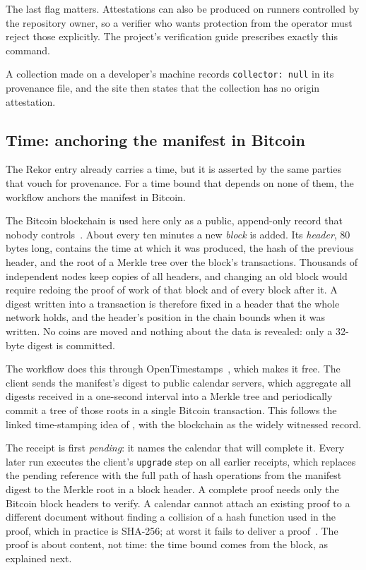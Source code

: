 The last flag matters. Attestations can also be produced on runners controlled by the repository owner, so a verifier who wants protection from the operator must reject those explicitly. The project's verification guide prescribes exactly this command.

A collection made on a developer's machine records \texttt{collector:\ null} in its provenance file, and the site then states that the collection has no origin attestation.

\subsection{Time: anchoring the manifest in Bitcoin}
\label{sec:time}

The Rekor entry already carries a time, but it is asserted by the same parties that vouch for provenance. For a time bound that depends on none of them, the workflow anchors the manifest in Bitcoin.

The Bitcoin blockchain is used here only as a public, append-only record that nobody controls~\citep{nakamoto2008bitcoin}. About every ten minutes a new \emph{block} is added. Its \emph{header}, 80 bytes long, contains the time at which it was produced, the hash of the previous header, and the root of a Merkle tree over the block's transactions. Thousands of independent nodes keep copies of all headers, and changing an old block would require redoing the proof of work of that block and of every block after it. A digest written into a transaction is therefore fixed in a header that the whole network holds, and the header's position in the chain bounds when it was written. No coins are moved and nothing about the data is revealed: only a 32-byte digest is committed.

The workflow does this through OpenTimestamps~\citep{todd2016opentimestamps}, which makes it free. The client sends the manifest's digest to public calendar servers, which aggregate all digests received in a one-second interval into a Merkle tree and periodically commit a tree of those roots in a single Bitcoin transaction. This follows the linked time-stamping idea of \citet{haber1991timestamp}, with the blockchain as the widely witnessed record.

The receipt is first \emph{pending}: it names the calendar that will complete it. Every later run executes the client's \texttt{upgrade} step on all earlier receipts, which replaces the pending reference with the full path of hash operations from the manifest digest to the Merkle root in a block header. A complete proof needs only the Bitcoin block headers to verify. A calendar cannot attach an existing proof to a different document without finding a collision of a hash function used in the proof, which in practice is SHA-256; at worst it fails to deliver a proof~\citep{todd2016opentimestamps}. The proof is about content, not time: the time bound comes from the block, as explained next.

